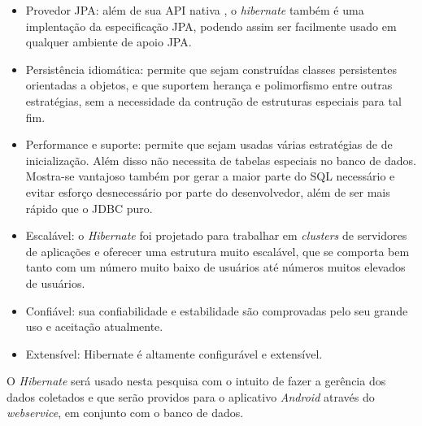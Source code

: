 	\begin{itemize}
	  
	  		\item Provedor JPA: além de sua API nativa , o \textit{hibernate}
	  	também é uma implentação da especificação JPA, podendo assim ser facilmente
	  	usado em qualquer ambiente de apoio JPA.
	  		
	  		\item Persistência idiomática: permite que sejam construídas classes
	  	persistentes orientadas a objetos, e que suportem herança e polimorfismo
	  	entre outras estratégias, sem a necessidade da contrução de estruturas
	  	especiais para tal fim.
	  	
	  		\item Performance e suporte: permite que sejam usadas várias estratégias de
	  	 de inicialização. Além disso não necessita de tabelas especiais no banco de
	  	 dados. Mostra-se vantajoso também por gerar a maior parte do SQL
	  	 necessário e evitar esforço desnecessário por parte do desenvolvedor, além
	  	 de ser mais rápido que o JDBC puro.
	  
	  		\item Escalável: o \textit{Hibernate} foi projetado para trabalhar em
	  	\textit{clusters} de servidores de aplicações e oferecer uma estrutura
	  	muito escalável, que se comporta bem tanto com um número muito baixo de
	  	usuários até números muitos elevados de usuários.

			\item Confiável: sua confiabilidade e estabilidade são comprovadas pelo
		seu grande uso e aceitação atualmente.
			
			\item Extensível: Hibernate é altamente configurável e extensível.
	
	\end{itemize}
	
	\par O \textit{Hibernate} será usado nesta pesquisa com o intuito de fazer a
gerência dos dados coletados e que serão providos para o aplicativo
\textit{Android} através do \textit{webservice}, em conjunto com o banco de
dados.
